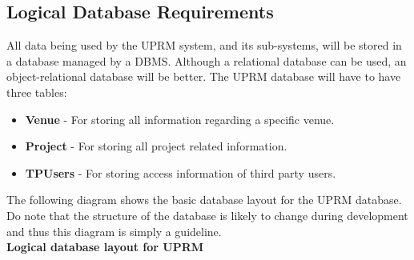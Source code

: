 	\subsection{Logical Database Requirements}
		All data being used by the UPRM system, and its sub-systems, will be stored in a database managed by a DBMS. Although a relational database can be used, an object-relational database will be better. The UPRM database will have to have three tables:
		\begin{itemize}
			\item \textbf{Venue} - For storing all information regarding a specific venue.
			\item \textbf{Project} - For storing all project related information.
			\item \textbf{TPUsers} - For storing access information of third party users.
		\end{itemize}
		
		The following diagram shows the basic database layout for the UPRM database. Do note that the structure of the database is likely to change during development and thus this diagram is simply a guideline.\\
		\textbf{Logical database layout for UPRM}\\
		\centerline{}